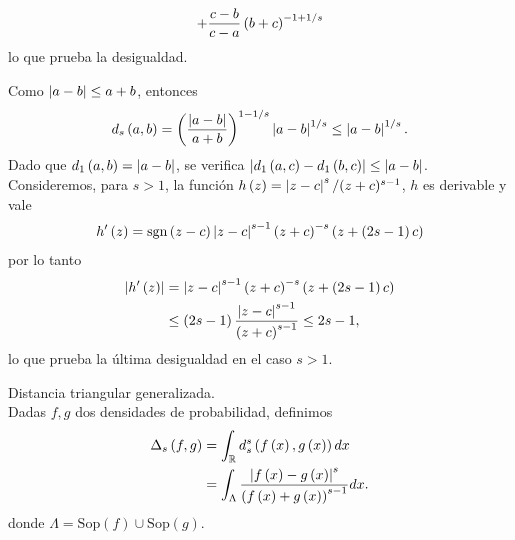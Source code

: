 \begin{dem}
\begin{enumerate}[i)]
\begin{align*}
		+ \frac{c-b}{c-a} \left( b+c \right)^{-1+1/s}
		\end{align*}
		lo que prueba la desigualdad.
	\end{enumerate}
	Como $\left| a-b \right|\le a+b$, entonces 
	\begin{align*}
	d_{s}\left( a,b \right) = \left( \frac{\left| a-b \right|}{a+b} \right)^{1-1/s} \left| a-b \right|^{1/s} \le \left| a-b \right|^{1/s}.
	\end{align*}
	Dado que $d_{1}\left( a,b \right) = \left| a-b \right|$, se verifica $\left| d_{1}\left( a,c \right)-d_{1}\left( b,c \right) \right| \le \left| a-b \right|$. Consideremos, para $s>1$, la función
	$h\left( z \right) = \left| z-c \right|^{s}/(z+c)^{s-1}$, $h$ es derivable y vale
	\begin{align*}
	h'\pa{z} = %
	\sig{z-c}\abs{z-c}^{s-1} \pa{z+c}^{-s} \pa{z+\pa{2s-1}c}
	\end{align*}
	por lo tanto
	\begin{align*}
	\left| h'\left( z \right) \right| & = \left| z-c \right|^{s-1} \left( z+c \right)^{-s} \left( z+\left( 2s-1 \right)c \right) \\
	& \le \left( 2s-1 \right)\frac{\left| z-c \right|^{s-1}}{\left( z+c \right)^{s-1}} \le 2s - 1,
	\end{align*}
	lo que prueba la última desigualdad en el caso $s>1$.
\end{dem}

\begin{definition} Distancia triangular generalizada.\\
	\label{TriangularGeneralizada}
	Dadas $f,g$ dos densidades de probabilidad, definimos
	\begin{align*}
	\Delta_{s}\left( f,g \right) &= \displaystyle \int_{\mathbb{R}} d_{s}^{s}\left( f\left( x \right),g\left( x \right) \right) dx\\
	                   &= \displaystyle \int_{\Lambda} \dfrac{\left| f\left( x \right) - g\left( x \right) \right|^s}{\left( f\left( x \right) + g\left( x \right) \right)^{s-1}} dx.
	\end{align*}
	donde $\Lambda=\mathrm{Sop}(f) \cup \mathrm{Sop}(g).$
\end{definition}

